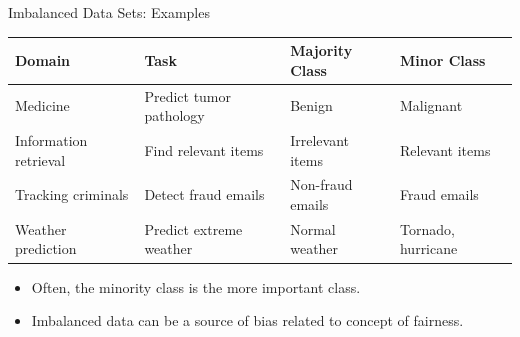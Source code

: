 \documentclass[10pt,compress,t,notes=noshow, xcolor=table]{beamer}
\begin{document}
\begin{frame}{Imbalanced Data Sets: Examples}
    \small
    \begin{table}[h]
        \scriptsize
        \centering
        \begin{tabular}{llll}
            \toprule
            \textbf{Domain} & \textbf{Task} & \textbf{Majority Class} & \textbf{Minor Class} \\ [5pt]
            \hline
            Medicine & Predict tumor pathology & Benign &  Malignant \\ [5pt]
            Information retrieval & Find relevant items & Irrelevant items & Relevant items \\ [5pt]
            Tracking criminals & Detect fraud emails & Non-fraud emails & Fraud emails \\ [5pt]
            Weather prediction & Predict extreme weather & Normal weather & Tornado, hurricane \\
            \hline
        \end{tabular}
    \end{table}
    
	\begin{itemize}
        \item Often, the minority class is the more important class.
        \item Imbalanced data can be a source of bias related to concept of fairness. %
	\end{itemize}

\end{frame}
\end{document}
